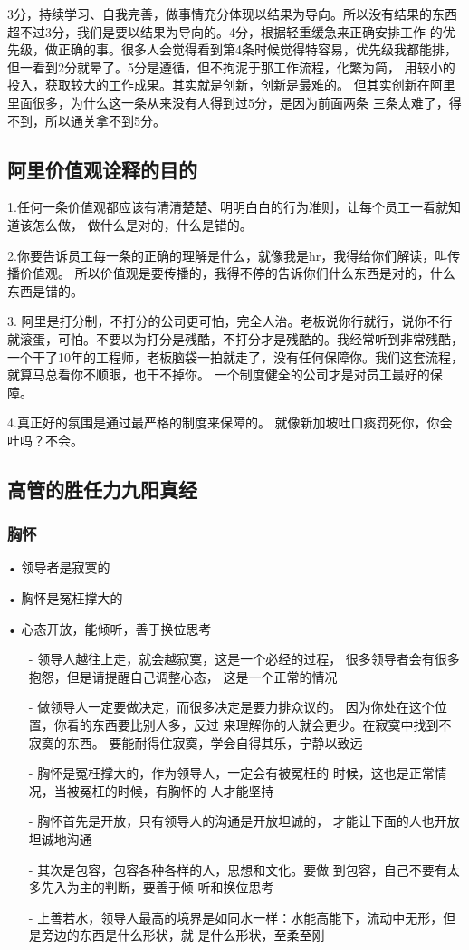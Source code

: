 \documentclass[12pt]{article}
\begin{document}
3分，持续学习、自我完善，做事情充分体现以结果为导向。所以没有结果的东西超不过3分，我们是要以结果为导向的。4分，根据轻重缓急来正确安排工作 的优先级，做正确的事。很多人会觉得看到第4条时候觉得特容易，优先级我都能排，但一看到2分就晕了。5分是遵循，但不拘泥于那工作流程，化繁为简， 用较小的投入，获取较大的工作成果。其实就是创新，创新是最难的。 但其实创新在阿里里面很多，为什么这一条从来没有人得到过5分，是因为前面两条 三条太难了，得不到，所以通关拿不到5分。

\subsection{阿里价值观诠释的目的}
1.任何一条价值观都应该有清清楚楚、明明白白的行为准则，让每个员工一看就知道该怎么做， 做什么是对的，什么是错的。

2.你要告诉员工每一条的正确的理解是什么，就像我是hr，我得给你们解读，叫传播价值观。 所以价值观是要传播的，我得不停的告诉你们什么东西是对的，什么东西是错的。

3. 阿里是打分制，不打分的公司更可怕，完全人治。老板说你行就行，说你不行就滚蛋，可怕。不要以为打分是残酷，不打分才是残酷的。我经常听到非常残酷，一个干了10年的工程师，老板脑袋一拍就走了，没有任何保障你。我们这套流程，就算马总看你不顺眼，也干不掉你。 一个制度健全的公司才是对员工最好的保障。

4.真正好的氛围是通过最严格的制度来保障的。 就像新加坡吐口痰罚死你，你会吐吗？不会。

\subsection{高管的胜任力九阳真经}
\subsubsection{胸怀}
• 领导者是寂寞的

• 胸怀是冤枉撑大的

• 心态开放，能倾听，善于换位思考
\begin{itemize}
\setlength{\itemsep}{0pt}
\setlength{\parsep}{0pt}
\setlength{\parskip}{0pt}
    \item[-] 领导人越往上走，就会越寂寞，这是一个必经的过程， 很多领导者会有很多抱怨，但是请提醒自己调整心态， 这是一个正常的情况
    \item[-] 做领导人一定要做决定，而很多决定是要力排众议的。 因为你处在这个位置，你看的东西要比别人多，反过 来理解你的人就会更少。在寂寞中找到不寂寞的东西。 要能耐得住寂寞，学会自得其乐，宁静以致远
    \item[-] 胸怀是冤枉撑大的，作为领导人，一定会有被冤枉的 时候，这也是正常情况，当被冤枉的时候，有胸怀的 人才能坚持
    \item[-] 胸怀首先是开放，只有领导人的沟通是开放坦诚的， 才能让下面的人也开放坦诚地沟通
    \item[-] 其次是包容，包容各种各样的人，思想和文化。要做 到包容，自己不要有太多先入为主的判断，要善于倾 听和换位思考
    \item[-] 上善若水，领导人最高的境界是如同水一样：水能高能下，流动中无形，但是旁边的东西是什么形状，就 是什么形状，至柔至刚
\end{itemize}
\end{document}
